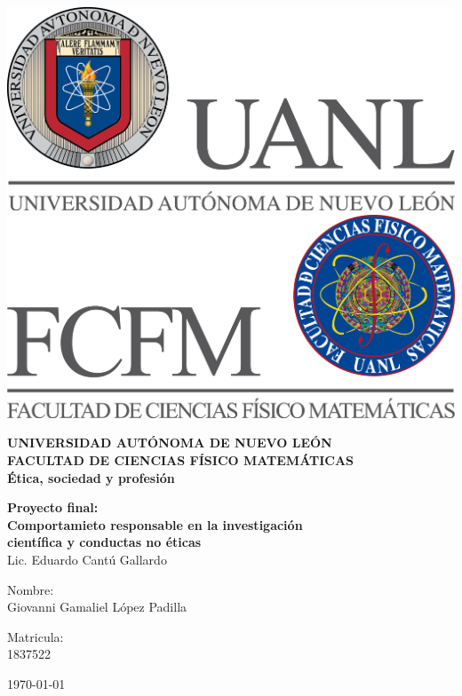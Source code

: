 \begin{titlepage}
\begin{center}
\includegraphics[scale=0.40]{../../Logos/uanl.png} 
\hspace{2.5cm}
\includegraphics[scale=0.40]{../../Logos/fcfm.png}
\end{center}
\vspace{1.5cm}
\begin{center}
\large{\textbf{
UNIVERSIDAD AUTÓNOMA DE NUEVO LEÓN\\
FACULTAD DE CIENCIAS
FÍSICO MATEMÁTICAS}}\\
\vspace*{2.5cm}
\Large{\textbf{Ética, sociedad y profesión}} \vspace{1cm}\\
\begin{large}
\textbf{Proyecto final: \vspace{0.5cm}\\ Comportamieto responsable en la investigación\\ científica y conductas no éticas  \vspace{0.5cm}\\}
Lic. Eduardo Cantú Gallardo\\
\end{large}
\vspace{3.5cm}
\begin{minipage}{0.6\linewidth}
\changefontsizes{14pt}
Nombre:\\
Giovanni Gamaliel López Padilla\\
\end{minipage}
\begin{minipage}{0.2\linewidth}
\changefontsizes{14pt}
Matricula:\\
1837522\\
\end{minipage}
\end{center}
\vspace{4cm}
\begin{flushright}
\today
\end{flushright}
\pagebreak
\end{titlepage}